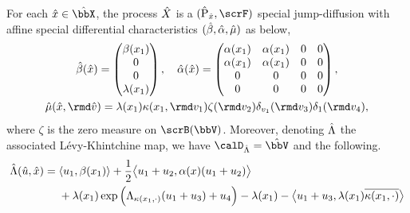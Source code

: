 \begin{proposition}
  \label{proposition:joint-characteristics}
  For each $\hat\stateVar \in \hat\stateSpace$, the process $\hat{X}$ is a $(\hat\Prb_{\hat\stateVar}, \scrF)$ special jump-diffusion with affine special differential characteristics $(\hat{\beta}, \hat{\alpha}, \hat{\mu})$ as below,
  \begin{equation}
    \label{eq:joint-characteristics}
    \begin{gathered}
      \hat\affDrift(\hat\stateVar) = \begin{pmatrix} \affDrift(\stateVar_1) \\ 0 \\ 0 \\ \affInt(\stateVar_1) \end{pmatrix}, \quad
      \hat\affDiff(\hat\stateVar) = \begin{pmatrix} \affDiff(\stateVar_1) & \affDiff(\stateVar_1) & 0 & 0 \\ \affDiff(\stateVar_1) & \affDiff(\stateVar_1) & 0 & 0 \\ 0 & 0 & 0 & 0 \\ 0 & 0 & 0 & 0 \end{pmatrix}, \\
      \hat\affJump(\hat\stateVar, \rmd\hat\markVar) = \affInt(\stateVar_1) \affDist(\stateVar_1, \rmd\markVar_1) \zeta(\rmd\markVar_2) \delta_{\markVar_1}(\rmd\markVar_3) \delta_1(\rmd\markVar_4),
    \end{gathered}
  \end{equation}
  where $\zeta$ is the zero measure on $\scrB(\vecSpace)$.
  Moreover, denoting $\hat{\Lambda}$ the associated L\'evy-Khintchine map, we have $\odeSpaceJoint = \hat\vecSpace$ and the following.
  \begin{equation*}
    \hat{\Lambda}(\hat{u}, \hat{x}) = \begin{aligned}[t]
      &{\langle u_1 , \beta(x_1) \rangle} + \frac12{\big\langle u_1+u_2 , \alpha(x)(u_1+u_2) \big\rangle} \\
      &+ \lambda(x_1)\exp\Big(\Lambda_{\kappa(x_1,\cdot)}(u_1+u_3) + u_4\Big) - \lambda(x_1) -  {\big\langle u_1+u_3 , \lambda(x_1)\overline{\kappa(x_1,\cdot)} \big\rangle} 
    \end{aligned}
  \end{equation*}
\end{proposition}
